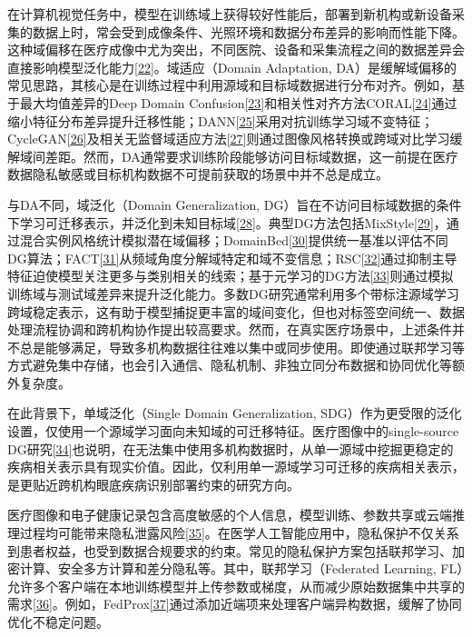 在计算机视觉任务中，模型在训练域上获得较好性能后，部署到新机构或新设备采集的数据上时，常会受到成像条件、光照环境和数据分布差异的影响而性能下降。这种域偏移在医疗成像中尤为突出，不同医院、设备和采集流程之间的数据差异会直接影响模型泛化能力\hyperref[_Ref213949439]{{[}22{]}}。域适应（Domain Adaptation, DA）是缓解域偏移的常见思路，其核心是在训练过程中利用源域和目标域数据进行分布对齐。例如，基于最大均值差异的Deep Domain Confusion\hyperref[_Ref213949448]{{[}23{]}}和相关性对齐方法CORAL\hyperref[_Ref213949453]{{[}24{]}}通过缩小特征分布差异提升迁移性能；DANN\hyperref[_Ref213949479]{{[}25{]}}采用对抗训练学习域不变特征；CycleGAN\hyperref[_Ref213949490]{{[}26{]}}及相关无监督域适应方法\hyperref[_Ref213949530]{{[}27{]}}则通过图像风格转换或跨域对比学习缓解域间差距。然而，DA通常要求训练阶段能够访问目标域数据，这一前提在医疗数据隐私敏感或目标机构数据不可提前获取的场景中并不总是成立。

与DA不同，域泛化（Domain Generalization, DG）旨在不访问目标域数据的条件下学习可迁移表示，并泛化到未知目标域\hyperref[_Ref213949554]{{[}28{]}}。典型DG方法包括MixStyle\hyperref[_Ref213949562]{{[}29{]}}，通过混合实例风格统计模拟潜在域偏移；DomainBed\hyperref[_Ref213949607]{{[}30{]}}提供统一基准以评估不同DG算法；FACT\hyperref[_Ref213949788]{{[}31{]}}从频域角度分解域特定和域不变信息；RSC\hyperref[_Ref213949796]{{[}32{]}}通过抑制主导特征迫使模型关注更多与类别相关的线索；基于元学习的DG方法\hyperref[_Ref213949803]{{[}33{]}}则通过模拟训练域与测试域差异来提升泛化能力。多数DG研究通常利用多个带标注源域学习跨域稳定表示，这有助于模型捕捉更丰富的域间变化，但也对标签空间统一、数据处理流程协调和跨机构协作提出较高要求。然而，在真实医疗场景中，上述条件并不总是能够满足，导致多机构数据往往难以集中或同步使用。即使通过联邦学习等方式避免集中存储，也会引入通信、隐私机制、非独立同分布数据和协同优化等额外复杂度。

在此背景下，单域泛化（Single Domain Generalization, SDG）作为更受限的泛化设置，仅使用一个源域学习面向未知域的可迁移特征。医疗图像中的single-source DG研究\hyperref[_Ref213949863]{{[}34{]}}也说明，在无法集中使用多机构数据时，从单一源域中挖掘更稳定的疾病相关表示具有现实价值。因此，仅利用单一源域学习可迁移的疾病相关表示，是更贴近跨机构眼底疾病识别部署约束的研究方向。

\label{c.ux9690ux79c1ux4fddux62a4}

医疗图像和电子健康记录包含高度敏感的个人信息，模型训练、参数共享或云端推理过程均可能带来隐私泄露风险\hyperref[_Ref213950358]{{[}35{]}}。在医学人工智能应用中，隐私保护不仅关系到患者权益，也受到数据合规要求的约束。常见的隐私保护方案包括联邦学习、加密计算、安全多方计算和差分隐私等。其中，联邦学习（Federated Learning, FL）允许多个客户端在本地训练模型并上传参数或梯度，从而减少原始数据集中共享的需求\hyperref[_Ref213950376]{{[}36{]}}。例如，FedProx\hyperref[_Ref213950391]{{[}37{]}}通过添加近端项来处理客户端异构数据，缓解了协同优化不稳定问题。

